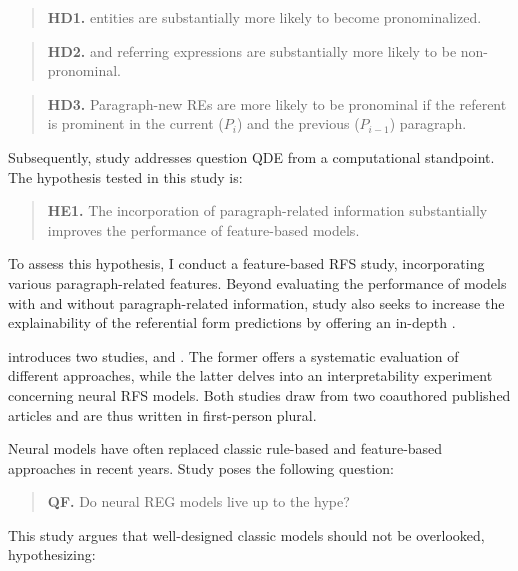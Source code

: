\begin{quote}
	\textbf{HD1.}  entities are substantially more likely to become pronominalized.
\end{quote}

\begin{quote}
	\textbf{HD2.}  and  referring expressions are substantially more likely to be non-pronominal.
\end{quote}

\begin{quote}
	\textbf{HD3.} Paragraph-new REs are more likely to be pronominal if the referent is prominent in the current ($P_{i}$) and the previous ($P_{i-1}$) paragraph.
\end{quote}


Subsequently, study \studE addresses question QDE from a computational standpoint. The hypothesis tested in this study is:

\begin{quote}
	\textbf{HE1.} The incorporation of paragraph-related information substantially improves the performance of feature-based \context models.
\end{quote}

To assess this hypothesis, I conduct a feature-based RFS study, incorporating various paragraph-related features. Beyond evaluating the performance of models with and without paragraph-related information, study \studE also seeks to increase the explainability of the referential form predictions by offering an in-depth .

 introduces two studies, \studF and \studG. The former offers a systematic evaluation of different \context approaches, while the latter delves into an interpretability experiment concerning neural RFS models. Both studies draw from two coauthored published articles \citep{same-etal-2022-non,chen-etal-2021-neural-referential} and are thus written in first-person plural.

Neural models have often replaced classic rule-based and feature-based approaches in recent years. Study \studF poses the following question:

\begin{quote}
	\textbf{QF.} Do neural REG models live up to the hype?
\end{quote}

This study argues that well-designed classic models should not be overlooked, hypothesizing: 

